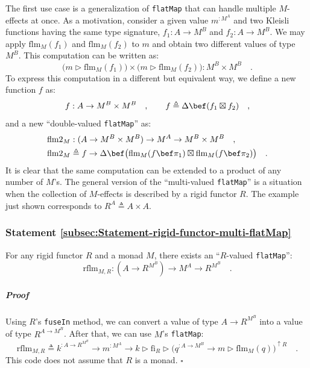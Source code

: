 The first use case is a generalization of \lstinline!flatMap! that
can handle multiple $M$-effects at once. As a motivation, consider
a given value $m^{:M^{A}}$ and two Kleisli functions having the same
type signature, $f_{1}:A\rightarrow M^{B}$ and $f_{2}:A\rightarrow M^{B}$.
We may apply $\text{flm}_{M}(f_{1})$ and $\text{flm}_{M}(f_{2})$
to $m$ and obtain two different values of type $M^{B}$. This computation
can be written as:
\[
\big(m\triangleright\text{flm}_{M}(f_{1})\big)\times\big(m\triangleright\text{flm}_{M}(f_{2})\big):M^{B}\times M^{B}\quad.
\]
To express this computation in a different but equivalent way, we
define a new function $f$ as:
\[
f:A\rightarrow M^{B}\times M^{B}\quad,\quad\quad f\triangleq\Delta\bef(f_{1}\boxtimes f_{2})\quad,
\]
and a new \textsf{``}double-valued \lstinline!flatMap!\textsf{''} as:
\begin{align*}
 & \text{flm2}_{M}:(A\rightarrow M^{B}\times M^{B})\rightarrow M^{A}\rightarrow M^{B}\times M^{B}\quad,\\
 & \text{flm2}_{M}\triangleq f\rightarrow\Delta\bef\big(\text{flm}_{M}(f\bef\pi_{1})\boxtimes\text{flm}_{M}(f\bef\pi_{2})\big)\quad.
\end{align*}
It is clear that the same computation can be extended to a product
of any number of $M$\textsf{'}s. The general version of the \textsf{``}multi-valued
\lstinline!flatMap!\textsf{''} is a situation when the collection of $M$-effects
is described by a rigid functor $R$. The example just shown corresponds
to $R^{A}\triangleq A\times A$.

\subsubsection{Statement \label{subsec:Statement-rigid-functor-multi-flatMap}\ref{subsec:Statement-rigid-functor-multi-flatMap}}

For any rigid functor $R$ and a monad $M$, there exists an \textsf{``}$R$-valued
\lstinline!flatMap!\textsf{''}:
\[
\text{rflm}_{M,R}:(A\rightarrow R^{M^{B}})\rightarrow M^{A}\rightarrow R^{M^{B}}\quad.
\]


\subparagraph{Proof}

Using $R$\textsf{'}s \lstinline!fuseIn! method, we can convert a value of
type $A\rightarrow R^{M^{B}}$ into a value of type $R^{A\rightarrow M^{B}}$.
After that, we can use $M$\textsf{'}s \lstinline!flatMap!:
\[
\text{rflm}_{M,R}\triangleq k^{:A\rightarrow R^{M^{B}}}\rightarrow m^{:M^{A}}\rightarrow k\triangleright\text{fi}_{R}\triangleright\big(q^{:A\rightarrow M^{B}}\rightarrow m\triangleright\text{flm}_{M}(q)\big)^{\uparrow R}\quad.
\]
This code does not assume that $R$ is a monad. $\square$

